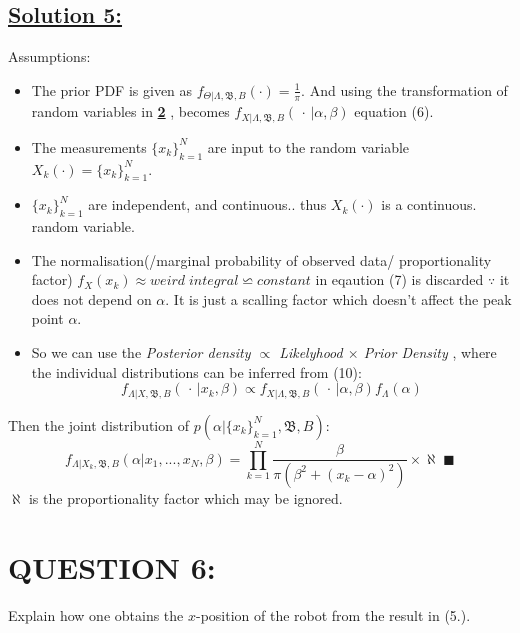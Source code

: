 \documentclass[a4paper,11pt]{article}
\begin{document}
\subsection*{\underline{Solution 5:}}
Assumptions:
\begin{itemize}
	\item The prior PDF is given as $f_{\Theta|\Lambda, \mathfrak{B},B}(\cdot) = \frac{1}{\pi}$. And using the transformation of random variables in \hyperref[sec:proof]{\textbf{2}} , becomes $f_{X | \Lambda, \mathfrak{B}, B}(\, \cdot \, | \alpha, \beta)$ equation (6).
	\item The measurements $\{x_k\}^N _{k = 1}$ are input to the random variable $X_k(\cdot) = \{x_k\}^N _{k = 1}$.
	\item $\{x_k\}^N _{k = 1}$ are independent, and continuous.. thus $X_k(\cdot)$ is a continuous. random variable.
	\item The normalisation(/marginal probability of observed data/ proportionality factor) $f_X(x_k) \approx weird \; integral \backsimeq constant$ in eqaution (7) is discarded $\because$ it does not depend on $\alpha$. It is just a scalling factor which doesn't affect the peak point $\alpha$. 
	\item So we can use the \emph{Posterior density $\varpropto$ Likelyhood $\times$ Prior Density} \cite{stanford_lecture20}, where the individual distributions can be inferred from (10):
		\begin{equation}
			f_{\Lambda | X, \mathfrak{B},B} (\, \cdot \, | x_k, \beta) \varpropto f_{X | \Lambda, \mathfrak{B}, B}(\, \cdot \, | \alpha, \beta) f_\Lambda(\alpha)
		\end{equation}
\end{itemize}
Then the joint distribution of $p(\alpha | \{x_k\}^N _{k = 1}, \mathfrak{B}, B)$:
\begin{equation}
	f_{\Lambda | X_k, \mathfrak{B},B} (\alpha | x_1,...,x_N, \beta) = \prod^N _{k = 1} \frac{\beta}{\pi (\beta^2 + (x_k - \alpha)^2)} \times \aleph \; \blacksquare
\end{equation}
$\aleph$ is the proportionality factor which may be ignored.

\section{QUESTION 6:}
Explain how one obtains the $x$-position of the robot from the result in (5.).
\end{document}
